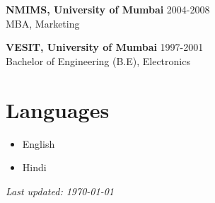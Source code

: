 \documentclass[a4paper,10pt]{article}
\begin{document}
\textbf{NMIMS, University of Mumbai} \hfill 2004-2008 \\
MBA, Marketing

\textbf{VESIT, University of Mumbai} \hfill 1997-2001 \\
Bachelor of Engineering (B.E), Electronics

\section*{Languages}
\begin{itemize}[leftmargin=0.5cm]
    \item English
    \item Hindi
\end{itemize}

\vfill
\begin{center}
    \footnotesize \textit{Last updated: \today}
\end{center}
\end{document}

